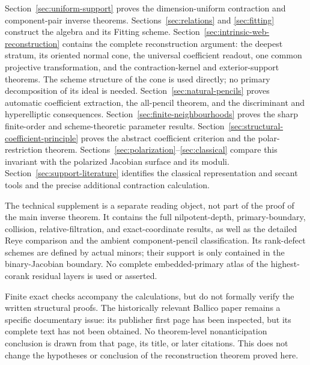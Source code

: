 Section~\ref{sec:uniform-support} proves the dimension-uniform
contraction and component-pair inverse theorems.
Sections~\ref{sec:relations} and \ref{sec:fitting} construct the algebra
and its Fitting scheme.  Section~\ref{sec:intrinsic-web-reconstruction}
contains the complete reconstruction argument: the deepest stratum,
its oriented normal cone, the universal coefficient readout, one
common projective transformation, and the contraction-kernel and
exterior-support theorems.  The scheme structure of the cone is
used directly; no primary decomposition of its ideal is needed.
Section~\ref{sec:natural-pencils} proves automatic coefficient extraction,
the all-pencil theorem, and the discriminant and hyperelliptic
consequences.  Section~\ref{sec:finite-neighbourhoods} proves the
sharp finite-order and scheme-theoretic parameter results.  Section~\ref{sec:structural-coefficient-principle} proves the abstract
coefficient criterion and the polar-restriction theorem.
Sections~\ref{sec:polarization}--\ref{sec:classical} compare this
invariant with the polarized Jacobian surface and its moduli.
Section~\ref{sec:support-literature} identifies the classical
representation and secant tools and the precise additional
contraction calculation.

The technical supplement is a separate reading object, not part of
the proof of the main inverse theorem.  It contains the full
nilpotent-depth, primary-boundary, collision, relative-filtration,
and exact-coordinate results, as well as the detailed Reye comparison
and the ambient component-pencil classification.  Its rank-defect
schemes are defined by actual minors; their support is only contained
in the binary-Jacobian boundary.  No complete embedded-primary atlas
of the highest-corank residual layers is used or asserted.

Finite exact checks accompany the calculations, but do not formally
verify the written structural proofs.  The historically relevant
Ballico paper \cite{Ballico93} remains a specific documentary issue:
its publisher first page has been inspected, but its complete text
has not been obtained.  No theorem-level nonanticipation conclusion
is drawn from that page, its title, or later citations.
This does not change the hypotheses or conclusion of the reconstruction
theorem proved here.
